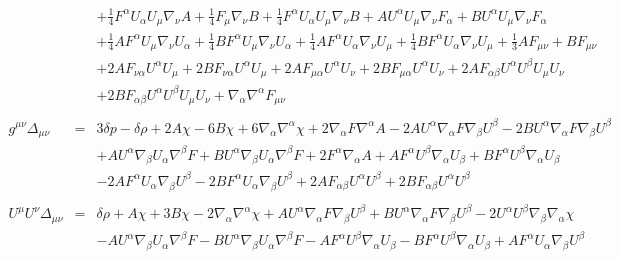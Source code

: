 \documentclass[10pt,letterpaper]{article}
\numberwithin{equation}{section}
\begin{document}
\begin{eqnarray}
&& + \tfrac{1}{4} F^{\alpha } U_{\alpha } U_{\mu } \nabla_{\nu }A + \tfrac{1}{4} F_{\mu } \nabla_{\nu }B + \tfrac{1}{4} F^{\alpha } U_{\alpha } U_{\mu } \nabla_{\nu }B + A U^{\alpha } U_{\mu } \nabla_{\nu }F_{\alpha } + B U^{\alpha } U_{\mu } \nabla_{\nu }F_{\alpha } \nonumber \\ 
&& + \tfrac{1}{4} A F^{\alpha } U_{\mu } \nabla_{\nu }U_{\alpha } + \tfrac{1}{4} B F^{\alpha } U_{\mu } \nabla_{\nu }U_{\alpha } + \tfrac{1}{4} A F^{\alpha } U_{\alpha } \nabla_{\nu }U_{\mu } + \tfrac{1}{4} B F^{\alpha } U_{\alpha } \nabla_{\nu }U_{\mu }+\tfrac{1}{3} A F_{\mu \nu } + B F_{\mu \nu } \nonumber \\ 
&& + 2 A F_{\nu \alpha } U^{\alpha } U_{\mu } + 2 B F_{\nu \alpha } U^{\alpha } U_{\mu } + 2 A F_{\mu \alpha } U^{\alpha } U_{\nu } + 2 B F_{\mu \alpha } U^{\alpha } U_{\nu } + 2 A F_{\alpha \beta } U^{\alpha } U^{\beta } U_{\mu } U_{\nu } \nonumber \\ 
&& + 2 B F_{\alpha \beta } U^{\alpha } U^{\beta } U_{\mu } U_{\nu } + \nabla_{\alpha }\nabla^{\alpha }F_{\mu \nu }
\\  \nonumber\\ 
g^{\mu\nu}\Delta_{\mu\nu}&=& 3 \delta p -  \delta \rho + 2 A \chi - 6 B \chi + 6 \nabla_{\alpha }\nabla^{\alpha }\chi + 2 \nabla_{\alpha }F \nabla^{\alpha }A - 2 A U^{\alpha } \nabla_{\alpha }F \nabla_{\beta }U^{\beta } - 2 B U^{\alpha } \nabla_{\alpha }F \nabla_{\beta }U^{\beta } \nonumber \\ 
&& + A U^{\alpha } \nabla_{\beta }U_{\alpha } \nabla^{\beta }F + B U^{\alpha } \nabla_{\beta }U_{\alpha } \nabla^{\beta }F+2 F^{\alpha } \nabla_{\alpha }A + A F^{\alpha } U^{\beta } \nabla_{\alpha }U_{\beta } + B F^{\alpha } U^{\beta } \nabla_{\alpha }U_{\beta } \nonumber \\ 
&& - 2 A F^{\alpha } U_{\alpha } \nabla_{\beta }U^{\beta } - 2 B F^{\alpha } U_{\alpha } \nabla_{\beta }U^{\beta }+2 A F_{\alpha \beta } U^{\alpha } U^{\beta } + 2 B F_{\alpha \beta } U^{\alpha } U^{\beta }
\\ \nonumber\\
U^\mu U^\nu \Delta_{\mu\nu}&=& \delta \rho + A \chi + 3 B \chi - 2 \nabla_{\alpha }\nabla^{\alpha }\chi + A U^{\alpha } \nabla_{\alpha }F \nabla_{\beta }U^{\beta } + B U^{\alpha } \nabla_{\alpha }F \nabla_{\beta }U^{\beta } - 2 U^{\alpha } U^{\beta } \nabla_{\beta }\nabla_{\alpha }\chi \nonumber \\ 
&& -  A U^{\alpha } \nabla_{\beta }U_{\alpha } \nabla^{\beta }F -  B U^{\alpha } \nabla_{\beta }U_{\alpha } \nabla^{\beta }F- A F^{\alpha } U^{\beta } \nabla_{\alpha }U_{\beta } -  B F^{\alpha } U^{\beta } \nabla_{\alpha }U_{\beta } + A F^{\alpha } U_{\alpha } \nabla_{\beta }U^{\beta } \nonumber \\ 

\end{eqnarray}
\end{document}
